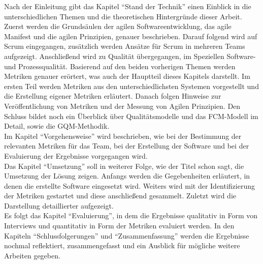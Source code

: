 Nach der Einleitung gibt das Kapitel ``Stand der Technik'' einen Einblick in die unterschiedlichen Themen und die theoretischen Hintergründe dieser Arbeit.
Zuerst werden die Grundsäulen der agilen Softwareentwicklung, das agile Manifest und die agilen Prinzipien, genauer beschrieben.
Darauf folgend wird auf Scrum eingegangen, zusätzlich werden Ansätze für Scrum in mehreren Teams aufgezeigt.
Anschließend wird zu Qualität übergegangen, im Speziellen Software- und Prozessqualität.
Basierend auf den beiden vorherigen Themen werden Metriken genauer erörtert, was auch der Hauptteil dieses Kapitels darstellt.
Im ersten Teil werden Metriken aus den unterschiedlichsten Systemen vorgestellt und die Erstellung eigener Metriken erläutert.
Danach folgen Hinweise zur Veröffentlichung von Metriken und der Messung von Agilen Prinzipien.
Den Schluss bildet noch ein Überblick über Qualitätsmodelle und das \ac{FCM}-Modell im Detail, sowie die \ac{GQM}-Methodik.
\\
Im Kapitel ``Vorgehensweise'' wird beschrieben, wie bei der Bestimmung der relevanten Metriken für das Team, bei der Erstellung der Software und bei der Evaluierung der Ergebnisse vorgegangen wird.
\\
Das Kapitel ``Umsetzung'' soll in weiterer Folge, wie der Titel schon sagt, die Umsetzung der Lösung zeigen.
Anfangs werden die Gegebenheiten erläutert, in denen die erstellte Software eingesetzt wird.
Weiters wird mit der Identifizierung der Metriken gestartet und diese anschließend gesammelt.
Zuletzt wird die Darstellung detaillierter aufgezeigt.
\\
Es folgt das Kapitel ``Evaluierung'', in dem die Ergebnisse qualitativ in Form von Interviews und quantitativ in Form der Metriken evaluiert werden.
In den Kapiteln ``Schlussfolgerungen'' und ``Zusammenfassung'' werden die Ergebnisse nochmal reflektiert, zusammengefasst und ein Ausblick für mögliche weitere Arbeiten gegeben.
